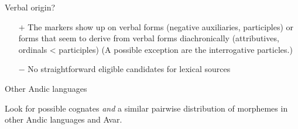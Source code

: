 \begin{frame}{Verbal origin?}

\begin{itemize}
   \item[{$+$}] The markers show up on verbal forms (negative auxiliaries, participles) or forms that seem to derive from verbal forms diachronically (attributives, ordinals < participles) (A possible exception are the interrogative particles.)
    \pause
    \item[{$-$}] No straightforward eligible candidates for lexical sources
   \end{itemize}
\end{frame}

\begin{frame}{Other Andic languages}

\begin{center}
Look for possible cognates \textit{and} a similar pairwise distribution of morphemes in other Andic languages and Avar.
\end{center}

\end{frame}

